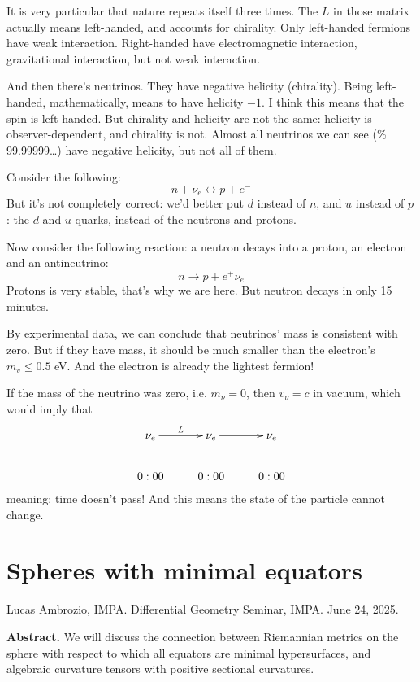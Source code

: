 \medskip

It is very particular that nature repeats
itself three times. The $L$ in those
matrix actually means left-handed, and
accounts for chirality. Only left-handed
fermions have weak interaction. Right-handed
have electromagnetic interaction,
gravitational interaction, but not weak
interaction.

And then there's neutrinos. They have
negative helicity (chirality). Being
left-handed, mathematically, means to have
helicity $-1$. I think this means
that the spin is left-handed. But chirality
and helicity are not the same:
helicity is observer-dependent, and chirality
is not. Almost all neutrinos we
can see (\% 99.99999…) have negative
helicity, but not all of them.

Consider the following:
$$
n+\nu_e\leftrightarrow p+e^-
$$
But it's not completely correct: we'd better
put $d$ instead of $n$, and $u$
instead of $p$: the $d$ and $u$ quarks,
instead of the neutrons and protons.

Now consider the following reaction: a
neutron decays into a proton, an electron
and an antineutrino:
$$
n\to p+e^+\overline{\nu}_e
$$
Protons is very stable, that's why we are
here. But neutron decays in only 15
minutes.

By experimental data, we can conclude that
neutrinos' mass is consistent with
zero. But if they have mass, it should be
much smaller than the electron's $m_v
\leq 0.5$ eV. And the electron is already the
lightest fermion!

If the mass of the neutrino was zero, i.e.
$m_\nu=0$, then $v_\nu=c$ in vacuum,
which would imply that
$$
\xymatrix{
\nu_e\ar[r]^{L}&\nu_e\ar[r]&\nu_e\\
0:00&0:00&0:00
}
$$
meaning: time doesn't pass! And this means
the state of the particle cannot
change.



\section{Spheres with minimal equators}
\label{section-spheres-with-minimal-equators}

\noindent
Lucas Ambrozio, IMPA.
Differential Geometry Seminar, IMPA.
June 24, 2025.

\medskip\noindent
{\bf Abstract.} We will discuss the
connection between Riemannian metrics on the
sphere with respect to which all equators are
minimal hypersurfaces, and
algebraic curvature tensors with positive
sectional curvatures.

